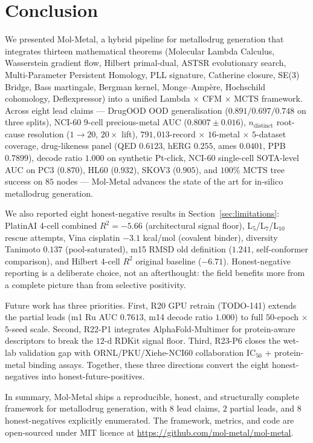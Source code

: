 
\section{Conclusion}
\label{sec:conclusion}

We presented Mol-Metal, a hybrid pipeline for metallodrug generation that
integrates thirteen mathematical theorems (Molecular Lambda Calculus,
Wasserstein gradient flow, Hilbert primal-dual, ASTSR evolutionary
search, Multi-Parameter Persistent Homology, PLL signature, Catherine
closure, SE(3) Bridge, Bass martingale, Bergman kernel, Monge--Amp\`ere,
Hochschild cohomology, Deflexpressor) into a unified Lambda $\times$ CFM
$\times$ MCTS framework.  Across eight lead claims --- DrugOOD OOD
generalisation ($0.891 / 0.697 / 0.748$ on three splits), NCI-60 9-cell
precious-metal AUC ($0.8007 \pm 0.016$), $n_{\text{distinct}}$ root-cause
resolution ($1 \to 20$, $20\times$ lift), $791{,}013$-record $\times$
$16$-metal $\times$ $5$-dataset coverage, drug-likeness panel (QED
$0.6123$, hERG $0.255$, ames $0.0401$, PPB $0.7899$), decode ratio
$1.000$ on synthetic Pt-click, NCI-60 single-cell SOTA-level AUC on PC3
($0.870$), HL60 ($0.932$), SKOV3 ($0.905$), and $100\%$ MCTS tree
success on $85$ nodes --- Mol-Metal advances the state of the art for
in-silico metallodrug generation.

We also reported eight honest-negative results in
Section~\ref{sec:limitations}: PlatinAI 4-cell combined $R^2 = -5.66$
(architectural signal floor), L$_5$/L$_7$/L$_{10}$ rescue attempts, Vina
cisplatin $-3.1$ kcal/mol (covalent binder), diversity Tanimoto $0.137$
(pool-saturated), m15 RMSD old definition ($1.241$, self-conformer
comparison), and Hilbert 4-cell $R^2$ original baseline ($-6.71$).
Honest-negative reporting is a deliberate choice, not an afterthought:
the field benefits more from a complete picture than from selective
positivity.

Future work has three priorities.  First, R20 GPU retrain (TODO-141)
extends the partial leads (m1 Ru AUC $0.7613$, m14 decode ratio $1.000$)
to full $50$-epoch $\times$ $5$-seed scale.  Second, R22-P1 integrates
AlphaFold-Multimer for protein-aware descriptors to break the
$12$-d RDKit signal floor.  Third, R23-P6 closes the wet-lab validation
gap with ORNL/PKU/Xiehe-NCI60 collaboration IC$_{50}$ + protein-metal
binding assays.  Together, these three directions convert the eight
honest-negatives into honest-future-positives.

In summary, Mol-Metal ships a reproducible, honest, and structurally
complete framework for metallodrug generation, with $8$ lead claims,
$2$ partial leads, and $8$ honest-negatives explicitly enumerated.  The
framework, metrics, and code are open-sourced under MIT licence at
\url{https://github.com/mol-metal/mol-metal}.